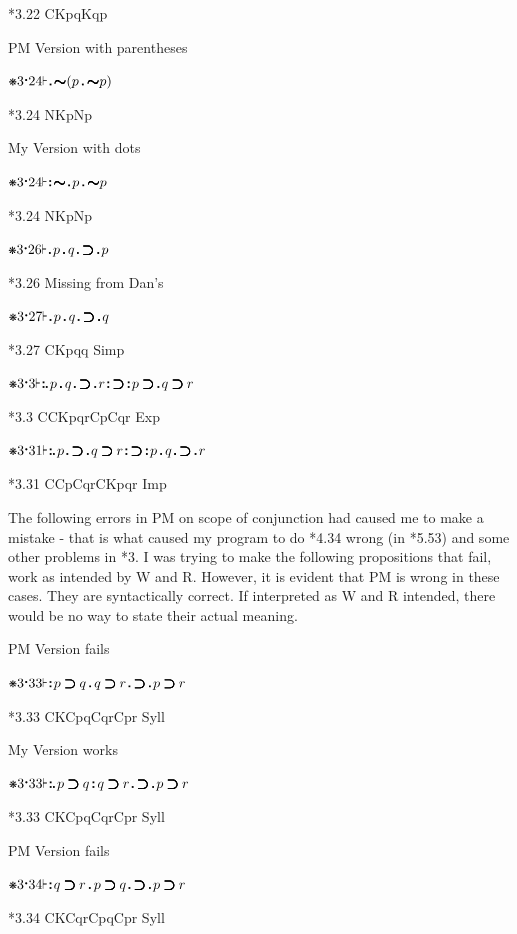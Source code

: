 \documentclass[12pt]{article}
\newcommand{\pmthm}{\mathpunct{\text{\scalebox{.5}[1]{$\boldsymbol\vdash$}}}} %
\newcommand{\pmast}{\text{\resizebox{!}{.75\height}{\ding{107}}}} %
\newcommand{\pmcdot}{\text{\raisebox{.05cm}{$\boldsymbol\cdot$}}} %
\newcommand{\pmd}{\hbox{\rule{.3ex}{.3ex}}} %
\newcommand{\pmdd}{\overset{\pmd}{\pmd}} %
\newcommand{\pmdot}{\mathinner{\pmd}}
\newcommand{\pmdott}{\mathinner{\pmdd}}
\newcommand{\pmdottt}{\mathinner{\pmdd\hspace{1pt}\pmd}}
\newcommand{\pmnot}{\mathord{\ooalign{$\boldsymbol{\sim}\mkern.5mu$\hidewidth\cr$\boldsymbol{\sim}$\cr\hidewidth$\mkern.5mu\boldsymbol{\sim}$}}}
\newcommand{\pmimp}{\mathbin{\ooalign{$\boldsymbol{\supset}\mkern.5mu$\hidewidth\cr$\boldsymbol{\supset}$\cr\hidewidth$\mkern.5mu\boldsymbol{\supset}$}}} %
\newcommand{\pmand}{\mathbin{\pmd}}%
\newcommand{\pmandd}{\mathbin{\pmdd}}
\begin{document}
*3.22 CKpqKqp

PM Version with parentheses

$\pmast 3 \pmcdot 24 \pmthm \pmdot \pmnot ( p \pmand \pmnot p) $

*3.24 NKpNp

My Version with dots

$\pmast 3 \pmcdot 24 \pmthm \pmdott \pmnot \pmdot p \pmand \pmnot p $

*3.24 NKpNp

$\pmast 3 \pmcdot 26 \pmthm \pmdot p \pmand q \pmdot \pmimp \pmdot p   $

*3.26 Missing from Dan's

$\pmast 3 \pmcdot 27 \pmthm \pmdot p \pmand q \pmdot \pmimp \pmdot q   $

*3.27 CKpqq Simp

$\pmast 3 \pmcdot 3 \pmthm \pmdottt p \pmand q \pmdot \pmimp \pmdot r \pmdott \pmimp \pmdott p \pmimp \pmdot q \pmimp r    $

*3.3 CCKpqrCpCqr Exp

$\pmast 3 \pmcdot 31 \pmthm \pmdottt p \pmdot \pmimp \pmdot q \pmimp r \pmdott \pmimp \pmdott p \pmand q \pmdot \pmimp \pmdot r      $

*3.31 CCpCqrCKpqr Imp

The following errors in PM on scope of conjunction had caused me to make a mistake - that is what caused my program to do *4.34 wrong (in *5.53) and some other problems in *3. I was trying to make the following propositions that fail, work as intended by W and R. However, it is evident that PM is wrong in these cases. They are syntactically correct. If interpreted as W and R intended, there would be no way to state their actual meaning. 

PM Version fails

$\pmast 3 \pmcdot 33 \pmthm \pmdott p \pmimp q \pmand q \pmimp r \pmdot \pmimp \pmdot p \pmimp r   $

*3.33 CKCpqCqrCpr Syll

My Version works

$\pmast 3 \pmcdot 33 \pmthm \pmdottt p \pmimp q \pmandd q \pmimp r \pmdot \pmimp \pmdot p \pmimp r   $

*3.33 CKCpqCqrCpr Syll

PM Version fails

$\pmast 3 \pmcdot 34 \pmthm \pmdott q \pmimp r \pmand p \pmimp q \pmdot \pmimp \pmdot p \pmimp r   $

*3.34 CKCqrCpqCpr Syll
\end{document}
